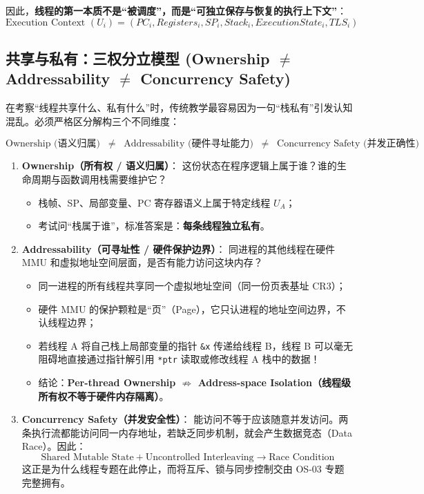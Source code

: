\documentclass[11pt,a4paper]{ctexart}
\newcommand{\kw}[1]{\textbf{#1}}
\newcommand{\code}[1]{\texttt{#1}}
\begin{document}
因此，\kw{线程的第一本质不是“被调度”，而是“可独立保存与恢复的执行上下文”}：
\[
\boxed{
\text{Execution Context } (U_i) = (PC_i, Registers_i, SP_i, Stack_i, ExecutionState_i, TLS_i)
}
\]

\subsection{共享与私有：三权分立模型 \texorpdfstring{(Ownership $\neq$ Addressability $\neq$ Concurrency Safety)}{(Ownership != Addressability != Concurrency Safety)}}

在考察“线程共享什么、私有什么”时，传统教学最容易因为一句“栈私有”引发认知混乱。必须严格区分解构三个不同维度：

\[
\boxed{
\text{Ownership (语义归属)}
\;\;\neq\;\;
\text{Addressability (硬件寻址能力)}
\;\;\neq\;\;
\text{Concurrency Safety (并发正确性)}
}
\]

\begin{enumerate}
\item \kw{Ownership（所有权 / 语义归属）}：
  这份状态在程序逻辑上属于谁？谁的生命周期与函数调用栈需要维护它？
  \begin{itemize}
    \item 栈帧、SP、局部变量、PC 寄存器语义上属于特定线程 $U_A$；
    \item 考试问“栈属于谁”，标准答案是：\kw{每条线程独立私有}。
  \end{itemize}

\item \kw{Addressability（可寻址性 / 硬件保护边界）}：
  同进程的其他线程在硬件 MMU 和虚拟地址空间层面，是否有能力访问这块内存？
  \begin{itemize}
    \item 同一进程的所有线程共享同一个虚拟地址空间（同一份页表基址 CR3）；
    \item 硬件 MMU 的保护颗粒是“页”（Page），它只认进程的地址空间边界，不认线程边界；
    \item 若线程 A 将自己栈上局部变量的指针 \code{\&x} 传递给线程 B，线程 B 可以毫无阻碍地直接通过指针解引用 \code{*ptr} 读取或修改线程 A 栈中的数据！
    \item 结论：\kw{Per-thread Ownership $\not\Rightarrow$ Address-space Isolation（线程级所有权不等于硬件内存隔离）}。
  \end{itemize}

\item \kw{Concurrency Safety（并发安全性）}：
  能访问不等于应该随意并发访问。两条执行流都能访问同一内存地址，若缺乏同步机制，就会产生数据竞态（Data Race）。因此：
  \[
  \boxed{\text{Shared Mutable State} + \text{Uncontrolled Interleaving} \longrightarrow \text{Race Condition}}
  \]
  这正是为什么线程专题在此停止，而将互斥、锁与同步控制交由 OS-03 专题完整拥有。
\end{enumerate}
\end{document}

